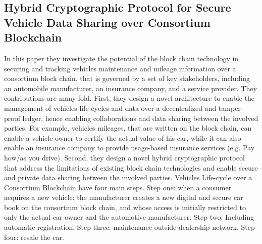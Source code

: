 			\subsection{Hybrid Cryptographic Protocol for Secure Vehicle Data Sharing over Consortium Blockchain \cite{paper13}}
			In this paper they investigate the potential of the block chain technology in securing and tracking vehicles maintenance and mileage information over a consortium block chain, that is governed by a set of key stakeholders, including an automobile manufacturer, an insurance company, and a service provider. They contributions are many-fold. First, they design a novel architecture to enable the management of vehicles life cycles and data over a decentralized and tamper-proof ledger, hence enabling collaborations and data sharing between the involved parties. For example, vehicles mileages, that are written on the block chain, can enable a vehicle owner to certify the actual value of his car, while it can also enable an insurance company to provide usage-based insurance services (e.g. Pay how/as you drive). Second, they design a novel hybrid cryptographic protocol that address the limitations of existing block chain technologies and enable secure and private data sharing between the involved parties. Vehicles Life-cycle over a Consortium Blockchain have four main steps. Step one: when a consumer acquires a new vehicle; the manufacturer creates a new digital and secure car book on the consortium block chain, and whose access is initially restricted to only the actual car owner and the automotive manufacturer. Step two: Including automatic registration. Step three: maintenance outside dealership network. Step four: resale the car. 
